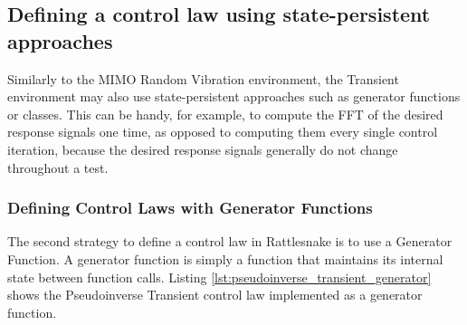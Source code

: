\documentclass[pdf,12pt,report]{SANDreport}
\begin{document}
    \subsection{Defining a control law using state-persistent approaches}
    
    Similarly to the \Ac{MIMO} Random Vibration environment, the Transient environment may also use state-persistent approaches such as generator functions or classes.  This can be handy, for example, to compute the \ac{FFT} of the desired response signals one time, as opposed to computing them every single control iteration, because the desired response signals generally do not change throughout a test.
    
    \subsubsection{Defining Control Laws with Generator Functions}
    
    The second strategy to define a control law in Rattlesnake is to use a Generator Function.  A generator function is simply a function that maintains its internal state between function calls.  Listing \ref{lst:pseudoinverse_transient_generator} shows the Pseudoinverse Transient control law implemented as a generator function.
    
\end{document}
